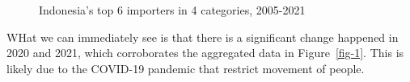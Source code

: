 \documentclass[
  a4paper,
  DIV=11,
  numbers=noendperiod]{scrreprt}
\begin{document}
\begin{figure}
\begin{minipage}{0.50\linewidth}


\end{minipage}%
%
\begin{minipage}{0.50\linewidth}



\end{minipage}%

\caption{\label{fig-M}Indonesia's top 6 importers in 4 categories,
2005-2021}

\end{figure}%

WHat we can immediately see is that there is a significant change
happened in 2020 and 2021, which corroborates the aggregated data in
Figure~\ref{fig-1}. This is likely due to the COVID-19 pandemic that
restrict movement of people.
\end{document}
